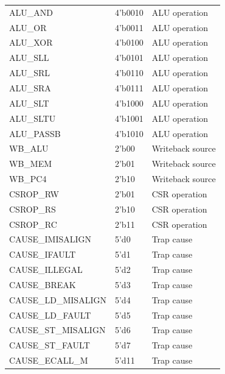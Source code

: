 \documentclass[11pt]{article}
\begin{document}
{\begin{longtable}{@{}L{0.4200\dimexpr\linewidth-24pt\relax}L{0.2500\dimexpr\linewidth-24pt\relax}L{0.3300\dimexpr\linewidth-24pt\relax}@{}}
ALU\_AND & 4'b0010 & ALU operation \\ \addlinespace[3pt]
ALU\_OR & 4'b0011 & ALU operation \\ \addlinespace[3pt]
ALU\_XOR & 4'b0100 & ALU operation \\ \addlinespace[3pt]
ALU\_SLL & 4'b0101 & ALU operation \\ \addlinespace[3pt]
ALU\_SRL & 4'b0110 & ALU operation \\ \addlinespace[3pt]
ALU\_SRA & 4'b0111 & ALU operation \\ \addlinespace[3pt]
ALU\_SLT & 4'b1000 & ALU operation \\ \addlinespace[3pt]
ALU\_SLTU & 4'b1001 & ALU operation \\ \addlinespace[3pt]
ALU\_PASSB & 4'b1010 & ALU operation \\ \addlinespace[3pt]
WB\_ALU & 2'b00 & Writeback source \\ \addlinespace[3pt]
WB\_MEM & 2'b01 & Writeback source \\ \addlinespace[3pt]
WB\_PC4 & 2'b10 & Writeback source \\ \addlinespace[3pt]
CSROP\_RW & 2'b01 & CSR operation \\ \addlinespace[3pt]
CSROP\_RS & 2'b10 & CSR operation \\ \addlinespace[3pt]
CSROP\_RC & 2'b11 & CSR operation \\ \addlinespace[3pt]
CAUSE\_IMISALIGN & 5'd0 & Trap cause \\ \addlinespace[3pt]
CAUSE\_IFAULT & 5'd1 & Trap cause \\ \addlinespace[3pt]
CAUSE\_ILLEGAL & 5'd2 & Trap cause \\ \addlinespace[3pt]
CAUSE\_BREAK & 5'd3 & Trap cause \\ \addlinespace[3pt]
CAUSE\_LD\_MISALIGN & 5'd4 & Trap cause \\ \addlinespace[3pt]
CAUSE\_LD\_FAULT & 5'd5 & Trap cause \\ \addlinespace[3pt]
CAUSE\_ST\_MISALIGN & 5'd6 & Trap cause \\ \addlinespace[3pt]
CAUSE\_ST\_FAULT & 5'd7 & Trap cause \\ \addlinespace[3pt]
CAUSE\_ECALL\_M & 5'd11 & Trap cause \\*
\bottomrule\end{longtable}}
\end{document}
